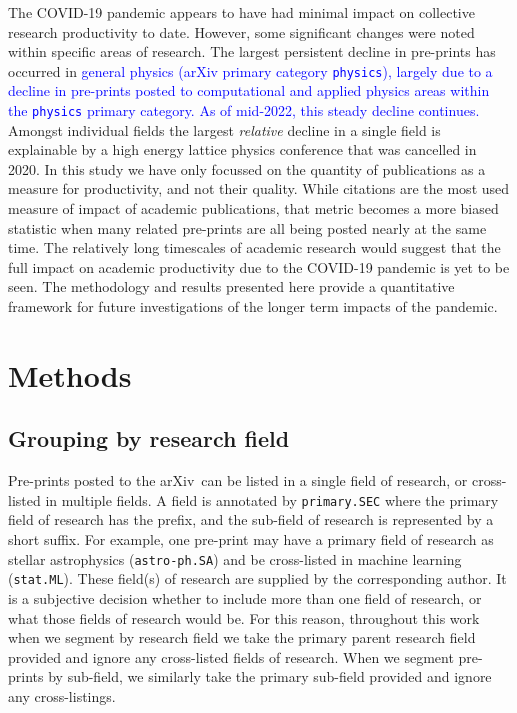 \documentclass[]{rsos}%
\newcommand{\arxiv}{arXiv}
\newcommand{\add}[1]{\textcolor{blue}{#1}}
\begin{document}
The COVID-19 pandemic appears to have had minimal impact on collective research productivity to date.
However, some significant changes were noted within specific areas of research. The largest persistent decline in pre-prints has occurred in \add{general physics (arXiv primary category \texttt{physics}), largely due to a decline in  pre-prints posted to computational and applied physics areas within the \texttt{physics} primary category. As of mid-2022, this steady decline continues.} Amongst individual fields the largest \emph{relative} decline in a single field is explainable by a high energy lattice physics conference that was cancelled in 2020. In this study we have only focussed on the quantity of publications as a measure for productivity, and not their quality. While citations are the most used measure of impact of academic publications, that metric becomes a more biased statistic when many related pre-prints are all being posted nearly at the same time\cite{Fassin:2021}. The relatively long timescales of academic research would suggest that the full impact on academic productivity due to the COVID-19 pandemic is yet to be seen. The methodology and results presented here provide a quantitative framework for future investigations of the longer term impacts of the pandemic.


\section*{Methods}

\subsection*{Grouping by research field}

Pre-prints posted to the \arxiv\ can be listed in a single field of research, or cross-listed in multiple fields. A field is annotated by \texttt{primary.SEC} where the primary field of research has the prefix, and the sub-field of research is represented by a short suffix. For example, one pre-print may have a primary field of research as stellar astrophysics (\texttt{astro-ph.SA}) and be cross-listed in machine learning (\texttt{stat.ML}). These field(s) of research are supplied by the corresponding author. It is a subjective decision whether to include more than one field of research, or what those fields of research would be. For this reason, throughout this work when we segment by research field we take the primary parent research field provided and ignore any cross-listed fields of research. When we segment pre-prints by sub-field, we similarly take the primary sub-field provided and ignore any cross-listings.
\end{document}
